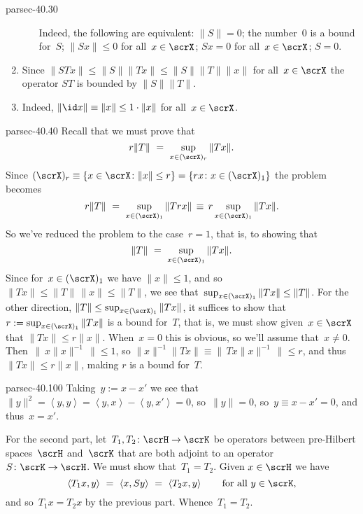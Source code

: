 \documentclass[b5page]{book}
\begin{document}
\begin{solution}{parsec-40.30}
\begin{enumerate}
\begin{enumerate}
Indeed, the following are equivalent:
$\|S\|=0$; the number~$0$ is a bound for~$S$;
$\|Sx\|\leq 0$ for all~$x\in\scrX$;
$Sx=0$ for all~$x\in\scrX$;
$S=0$.
\end{enumerate}
\item
Since $\|STx\|\leq \|S\| \|Tx\|
\leq \|S\|\|T\|\|x\|$
for all~$x\in \scrX$
the operator $ST$ is bounded by
$\|S\|\|T\|$.
\item
Indeed, $ \|\id x \|\equiv \|x\|\leq  1\cdot\|x\|$
for all~$x\in\scrX$.
\end{enumerate}
\end{solution}
\begin{solution}{parsec-40.40}%
Recall that we must prove that
    \begin{equation*}
r\|T\|\ = \ \sup_{x\in (\scrX)_r} \|Tx\|.
    \end{equation*}
Since $(\scrX)_r \equiv \{x\in\scrX\colon \|x\|\leq r\}
    = \{rx\colon x\in (\scrX)_1\}$
    the problem becomes
\begin{equation*}
r\|T\|\ = \ \sup_{x\in (\scrX)_1} \|Trx\|
    \,\equiv\, r\sup_{x\in (\scrX)_1} \|Tx\|.
\end{equation*}
So we've reduced the 
problem to the case~$r=1$, that is, to showing that
\begin{equation*}
    \|T\|\ = \ \sup_{x\in (\scrX)_1} \|Tx\|.
\end{equation*}
Since for~$x\in (\scrX)_1$
we have $\|x\|\leq 1$,
and so~$\|Tx\|\leq \|T\|\,\|x\|\leq \|T\|$,
we see that~$\sup_{x\in (\scrX)_1} \|Tx\|\leq \|T\|$.
For the other direction,
    $\|T\|\leq \sup_{x\in (\scrX)_1} \|Tx\|$,
    it suffices to show that
 $r:=\sup_{x\in(\scrX)_1} \|Tx\|$
is a bound for~$T$,
that is, we must show given~$x\in\scrX$
that $\|Tx\|\leq r\|x\|$.
When~$x=0$ this is obvious, so we'll assume that~$x\neq 0$.
Then~$\| \,x\|x\|^{-1}\,\|\leq 1$,
    so $\|x\|^{-1} \|Tx\|\equiv \|\,T x \|x\|^{-1}\, \| \leq r$,
    and thus $\|Tx\|\leq r\|x\|$,
    making $r$ is a bound for~$T$.
\end{solution}
\begin{solution}{parsec-40.100}%
Taking~$y:=x-x'$ we see that
$\|y\|^2 = \left<y,y\right>
= \left<y,x\right> - \left<y,x'\right> = 0$,
so~$\|y\|=0$,
so~$y\equiv x-x'=0$,
and thus~$x=x'$.

For the second part,
let~$T_1,T_2\colon \scrH\to\scrK$
be operators between pre-Hilbert spaces~$\scrH$
and~$\scrK$
that are both adjoint to an operator~$S\colon \scrK\to\scrH$.
We must show that~$T_1=T_2$.
Given $x\in\scrH$ we have
\begin{equation*}
\left<T_1x,y\right>
\ = \ 
\left<x,Sy\right>
\ = \ 
\left<T_2x,y\right>
\qquad 
    \text{for all~$y\in\scrK$,}
\end{equation*}
and so~$T_1x=T_2x$ by the previous part.
Whence~$T_1=T_2$.
\end{solution}
\end{document}
